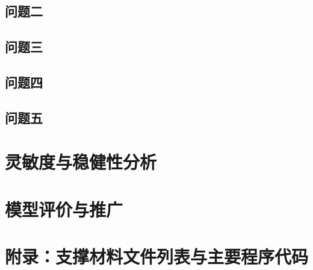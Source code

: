 \documentclass[12pt,a4paper,fontset=fandol]{ctexart}
\begin{document}
\subsection{问题二}

\subsection{问题三}

\subsection{问题四}

\subsection{问题五}


\section{灵敏度与稳健性分析}


\section{模型评价与推广}


\clearpage



\clearpage
\section*{附录：支撑材料文件列表与主要程序代码}

\end{document}
